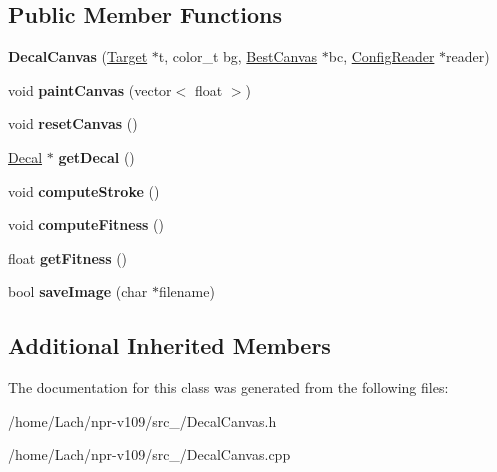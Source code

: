 \subsection*{Public Member Functions}
\begin{DoxyCompactItemize}
\item 
\hypertarget{classDecalCanvas_ad00c8fbce88da1fd173f7da551f7ef95}{}\label{classDecalCanvas_ad00c8fbce88da1fd173f7da551f7ef95} 
{\bfseries Decal\+Canvas} (\hyperlink{classTarget}{Target} $\ast$t, color\+\_\+t bg, \hyperlink{classBestCanvas}{Best\+Canvas} $\ast$bc, \hyperlink{classConfigReader}{Config\+Reader} $\ast$reader)
\item 
\hypertarget{classDecalCanvas_adbf1ef248c1cf7b6ed09abfa1ec05c08}{}\label{classDecalCanvas_adbf1ef248c1cf7b6ed09abfa1ec05c08} 
void {\bfseries paint\+Canvas} (vector$<$ float $>$)
\item 
\hypertarget{classDecalCanvas_a64baadb9a31c5aa598a45ce402d6d66a}{}\label{classDecalCanvas_a64baadb9a31c5aa598a45ce402d6d66a} 
void {\bfseries reset\+Canvas} ()
\item 
\hypertarget{classDecalCanvas_a8f122bff9c7696f184b8903dbb295af5}{}\label{classDecalCanvas_a8f122bff9c7696f184b8903dbb295af5} 
\hyperlink{classDecal}{Decal} $\ast$ {\bfseries get\+Decal} ()
\item 
\hypertarget{classDecalCanvas_aa2d4c9185e12bad6aa590a9f58477063}{}\label{classDecalCanvas_aa2d4c9185e12bad6aa590a9f58477063} 
void {\bfseries compute\+Stroke} ()
\item 
\hypertarget{classDecalCanvas_a6f9a66f4a1f22e227ef9120410534531}{}\label{classDecalCanvas_a6f9a66f4a1f22e227ef9120410534531} 
void {\bfseries compute\+Fitness} ()
\item 
\hypertarget{classDecalCanvas_a1e0134f001a92ce161838286fa73ad69}{}\label{classDecalCanvas_a1e0134f001a92ce161838286fa73ad69} 
float {\bfseries get\+Fitness} ()
\item 
\hypertarget{classDecalCanvas_a7309b13ba847f9efd36f94f50d2238bd}{}\label{classDecalCanvas_a7309b13ba847f9efd36f94f50d2238bd} 
bool {\bfseries save\+Image} (char $\ast$filename)
\end{DoxyCompactItemize}
\subsection*{Additional Inherited Members}


The documentation for this class was generated from the following files\+:\begin{DoxyCompactItemize}
\item 
/home/\+Lach/npr-\/v109/src\+\_/Decal\+Canvas.\+h\item 
/home/\+Lach/npr-\/v109/src\+\_/Decal\+Canvas.\+cpp\end{DoxyCompactItemize}

